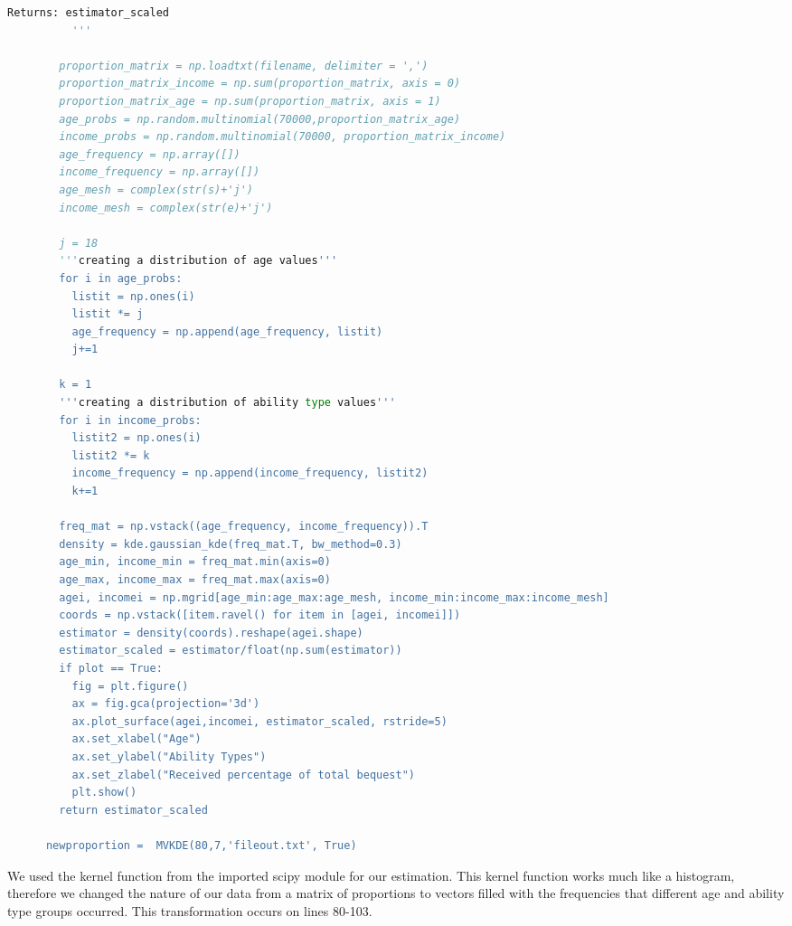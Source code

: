 \documentclass[letterpaper,12pt]{article}
\theoremstyle{definition}
\begin{document}
\begin{spacing}{1.5}
\begin{lstlisting}[language=Python, caption=MVKDE.py]
          Returns: estimator_scaled
          '''

        proportion_matrix = np.loadtxt(filename, delimiter = ',')
        proportion_matrix_income = np.sum(proportion_matrix, axis = 0)
        proportion_matrix_age = np.sum(proportion_matrix, axis = 1)
        age_probs = np.random.multinomial(70000,proportion_matrix_age)
        income_probs = np.random.multinomial(70000, proportion_matrix_income)
        age_frequency = np.array([])
        income_frequency = np.array([])
        age_mesh = complex(str(s)+'j')
        income_mesh = complex(str(e)+'j')

        j = 18
        '''creating a distribution of age values'''
        for i in age_probs:
          listit = np.ones(i)
          listit *= j
          age_frequency = np.append(age_frequency, listit)
          j+=1

        k = 1
        '''creating a distribution of ability type values'''
        for i in income_probs:
          listit2 = np.ones(i)
          listit2 *= k
          income_frequency = np.append(income_frequency, listit2)
          k+=1

        freq_mat = np.vstack((age_frequency, income_frequency)).T
        density = kde.gaussian_kde(freq_mat.T, bw_method=0.3)
        age_min, income_min = freq_mat.min(axis=0)
        age_max, income_max = freq_mat.max(axis=0)
        agei, incomei = np.mgrid[age_min:age_max:age_mesh, income_min:income_max:income_mesh]
        coords = np.vstack([item.ravel() for item in [agei, incomei]])
        estimator = density(coords).reshape(agei.shape)
        estimator_scaled = estimator/float(np.sum(estimator))
        if plot == True:
          fig = plt.figure()
          ax = fig.gca(projection='3d')
          ax.plot_surface(agei,incomei, estimator_scaled, rstride=5)
          ax.set_xlabel("Age")
          ax.set_ylabel("Ability Types")
          ax.set_zlabel("Received percentage of total bequest")
          plt.show()
        return estimator_scaled

      newproportion =  MVKDE(80,7,'fileout.txt', True)
    \end{lstlisting}

    We used the kernel function from the imported scipy module for our estimation. This kernel function works much like a histogram, therefore we changed the nature of our data from a matrix of proportions to vectors filled with the frequencies that different age and ability type groups occurred. This transformation occurs on lines 80-103.


\end{spacing}
\end{document}

